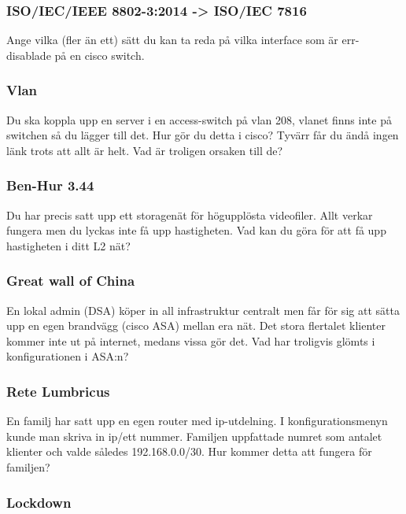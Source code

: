 \subsubsection{ISO/IEC/IEEE 8802-3:2014 -\textgreater{} ISO/IEC
7816}\label{isoiecieee-8802-32014---isoiec-7816}

Ange vilka (fler än ett) sätt du kan ta reda på vilka interface som är
err-disablade på en cisco switch.

\subsubsection{Vlan}\label{vlan}

Du ska koppla upp en server i en access-switch på vlan 208, vlanet finns
inte på switchen så du lägger till det. Hur gör du detta i cisco? Tyvärr
får du ändå ingen länk trots att allt är helt. Vad är troligen orsaken
till de?

\subsubsection{Ben-Hur 3.44}\label{ben-hur-3.44}

Du har precis satt upp ett storagenät för högupplösta videofiler. Allt
verkar fungera men du lyckas inte få upp hastigheten. Vad kan du göra
för att få upp hastigheten i ditt L2 nät?

\subsubsection{Great wall of China}\label{great-wall-of-china}

En lokal admin (DSA) köper in all infrastruktur centralt men får för sig
att sätta upp en egen brandvägg (cisco ASA) mellan era nät. Det stora
flertalet klienter kommer inte ut på internet, medans vissa gör det. Vad
har troligvis glömts i konfigurationen i ASA:n?

\subsubsection{Rete Lumbricus}\label{rete-lumbricus}

En familj har satt upp en egen router med ip-utdelning. I
konfigurationsmenyn kunde man skriva in ip/ett nummer. Familjen
uppfattade numret som antalet klienter och valde således 192.168.0.0/30.
Hur kommer detta att fungera för familjen?

\subsubsection{Lockdown}\label{lockdown}

